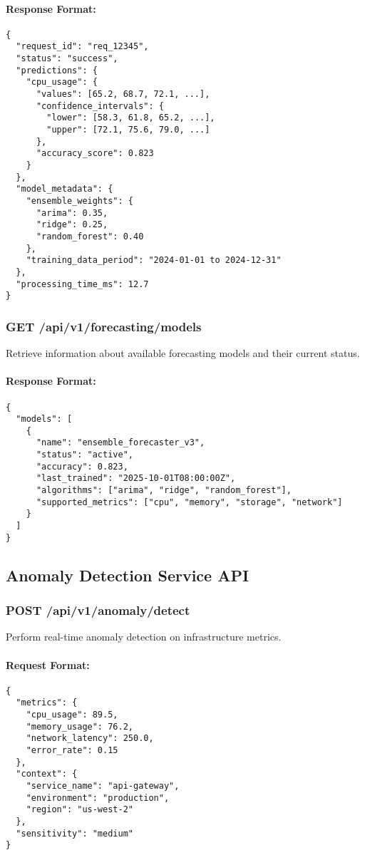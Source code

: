 \paragraph{Response Format:}
\begin{verbatim}
{
  "request_id": "req_12345",
  "status": "success",
  "predictions": {
    "cpu_usage": {
      "values": [65.2, 68.7, 72.1, ...],
      "confidence_intervals": {
        "lower": [58.3, 61.8, 65.2, ...],
        "upper": [72.1, 75.6, 79.0, ...]
      },
      "accuracy_score": 0.823
    }
  },
  "model_metadata": {
    "ensemble_weights": {
      "arima": 0.35,
      "ridge": 0.25,
      "random_forest": 0.40
    },
    "training_data_period": "2024-01-01 to 2024-12-31"
  },
  "processing_time_ms": 12.7
}
\end{verbatim}

\subsubsection{GET /api/v1/forecasting/models}

Retrieve information about available forecasting models and their current status.

\paragraph{Response Format:}
\begin{verbatim}
{
  "models": [
    {
      "name": "ensemble_forecaster_v3",
      "status": "active",
      "accuracy": 0.823,
      "last_trained": "2025-10-01T08:00:00Z",
      "algorithms": ["arima", "ridge", "random_forest"],
      "supported_metrics": ["cpu", "memory", "storage", "network"]
    }
  ]
}
\end{verbatim}

\subsection{Anomaly Detection Service API}

\subsubsection{POST /api/v1/anomaly/detect}

Perform real-time anomaly detection on infrastructure metrics.

\paragraph{Request Format:}
\begin{verbatim}
{
  "metrics": {
    "cpu_usage": 89.5,
    "memory_usage": 76.2,
    "network_latency": 250.0,
    "error_rate": 0.15
  },
  "context": {
    "service_name": "api-gateway",
    "environment": "production",
    "region": "us-west-2"
  },
  "sensitivity": "medium"
}
\end{verbatim}

